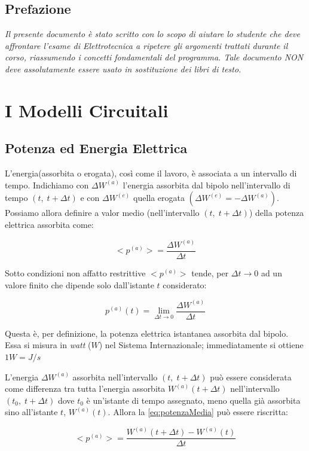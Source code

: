 \documentclass[a4paper]{report}
\begin{document}
\section*{Prefazione}
\emph{Il presente documento \`e stato scritto con lo scopo di aiutare
  lo studente che deve affrontare l'esame di Elettrotecnica a ripetere
  gli argomenti trattati durante il corso, riassumendo i concetti
  fondamentali del programma. Tale documento NON deve assolutamente
  essere usato in sostituzione dei libri di testo.}
\tableofcontents

\chapter{I Modelli Circuitali}
\section{Potenza ed Energia Elettrica}
L'energia(assorbita o erogata), cos\`i come il lavoro, \`e associata a
un intervallo di tempo. Indichiamo con $\Delta W^{(a)}$ l'energia
assorbita dal bipolo nell'intervallo di tempo $(t,\;t+ \Delta t)$ e
con $\Delta W^{(e)}$ quella erogata $(\Delta W^{(e)}=-\Delta
W^{(a)})$. Possiamo allora definire a valor medio (nell'intervallo
$(t,\;t+\Delta t)$) della potenza elettrica assorbita come:

\begin{equation}\label{eq:potenzaMedia}
<p^{(a)}>=\dfrac{\Delta W^{(a)}}{\Delta t}
\end{equation}

Sotto condizioni non affatto restrittive $<p^{(a)}>$ tende, per
$\Delta t \rightarrow 0$ ad un valore finito che dipende solo
dall'istante $t$ considerato:

\[
p^{(a)}(t)=\lim_{\Delta t \to 0} \frac{\Delta W^{(a)}}{\Delta t}
\]

Questa \`e, per definizione, la potenza elettrica istantanea assorbita
dal bipolo. Essa si misura in \emph{watt} ($W$) nel Sistema
Internazionale; immediatamente si ottiene $1W=J/s$

L'energia $\Delta W^{(a)}$ assorbita nell'intervallo $(t,\; t+\Delta
t)$ pu\`o essere considerata come differenza tra tutta l'energia
assorbita $W^{(a)}(t+\Delta t)$ nell'intervallo $(t_0,\; t+\Delta t)$
dove $t_0$ \`e un'istante di tempo assegnato, meno quella gi\`a
assorbita sino all'istante $t$, $W^{(a)}(t)$. Allora la
\ref{eq:potenzaMedia} pu\`o essere riscritta:

\[
<p^{(a)}>=\dfrac{W^{(a)}(t+\Delta t)-W^{(a)}(t)}{\Delta t}
\]
\end{document}
